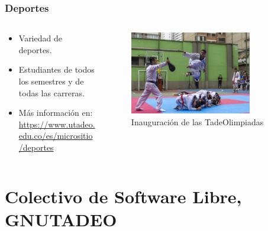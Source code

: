 \documentclass[17pt, t, lualatex]{beamer}
\begin{document}
\begin{frame}
  \frametitle{Deportes}
  \begin{columns}
    \begin{column}{.5\textwidth}
      \begin{itemize}
        \item Variedad de deportes.
        \item Estudiantes de todos los semestres y de todas las carreras.
        \item Más información en: \url{https://www.utadeo.edu.co/es/micrositio/deportes}
      \end{itemize}
    \end{column}

    \begin{column}{.5\textwidth}
      \begin{figure}
        \centering
        \includegraphics[width=0.8\textwidth]{img/TadeoOlimpiadas.jpg}
        \caption{Inauguración de las TadeOlimpiadas\cite{deportes2024}}
      \end{figure}
    \end{column}
  \end{columns}

\end{frame}


\section{Colectivo de Software Libre, GNUTADEO}

\insertsectionpage
\end{document}
